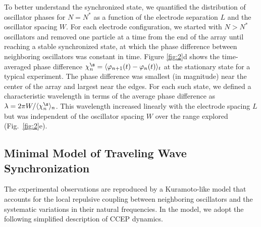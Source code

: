 To better understand the synchronized state, we quantified the distribution of oscillator phases for $N = N^*$ as a function of the electrode separation $L$ and the oscillator spacing $W$. For each electrode configuration, we started with $N>N^*$ oscillators and removed one particle at a time from the end of the array until reaching a stable synchronized state, at which the phase difference between neighboring oscillators was constant in time. Figure \ref{fig:2}d shows the time-averaged phase difference $\chi^{\s}_n = \langle \varphi_{n+1}(t) - \varphi_n(t) \rangle_t$ at the stationary state for a typical experiment. The phase difference was smallest (in magnitude) near the center of the array and largest near the edges. For each such state, we defined a characteristic wavelength in terms of the average phase difference as $\lambda = 2\pi W / \langle \chi_n^{\s} \rangle_n$. This wavelength increased linearly with the electrode spacing $L$ but was independent of the oscillator spacing $W$ over the range explored (Fig.~\ref{fig:2}e).

\subsection{Minimal Model of Traveling Wave Synchronization}

The experimental observations are reproduced by a Kuramoto-like model \autocite{Acebron2005} that accounts for the local repulsive coupling between neighboring oscillators and the systematic variations in their natural frequencies.  In the model, we adopt the following simplified description of CCEP dynamics\autocite{Kowalik2016}. 

